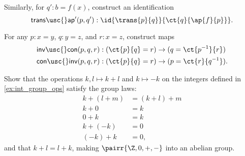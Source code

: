 \begin{exercises}
Similarly, for $q':b=f(x)$, construct an identification
\begin{equation*}
\mathsf{trans\usc{}ap'}(p,q'):\id{\trans{p}{q}}{\ct{q}{\ap{f}{p}}}.
\end{equation*}
\item \label{ex:inv_con}For any $p:x=y$, $q:y=z$, and $r:x=z$, construct maps
\begin{align*}
\mathsf{inv\usc{}con}(p,q,r) & : (\ct{p}{q}=r)\to (q=\ct{p^{-1}}{r}) \\
\mathsf{con\usc{}inv}(p,q,r) & : (\ct{p}{q}=r)\to (p=\ct{r}{q^{-1}}).
\end{align*}
\item \label{ex:int_group_laws}Show that the operations $k,l\mapsto k+l$ and $k\mapsto -k$ on the integers defined in \autoref{ex:int_group_ops} satisfy the group laws:
\begin{align*}
k+(l+m) & = (k+l)+m \\
k+0 & = k \\
0+k & = k \\
k+(-k) & = 0 \\
(-k) + k & = 0,
\end{align*}
and that $k+l=l+k$, making $\pairr{\Z,0,+,-}$ into an abelian group.
\end{exercises}
